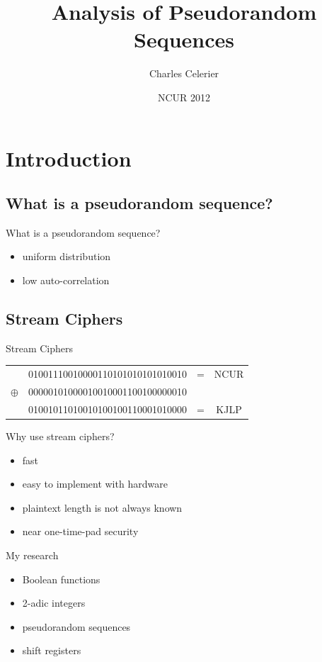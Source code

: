 \documentclass{beamer}
\begin{document}
\title{Analysis of Pseudorandom Sequences}
\author{Charles Celerier}
\date{NCUR 2012}
\frame{\titlepage}

\section{Introduction}
\subsection{What is a pseudorandom sequence?}
\begin{frame}{What is a pseudorandom sequence?}
  \begin{itemize}
      \pause
    \item uniform distribution
      \pause
    \item low auto-correlation
  \end{itemize}
\end{frame}

\subsection{Stream Ciphers}
\begin{frame}{Stream Ciphers}
  \begin{tabular}{c c c c}
    \pause
              & 01001110010000110101010101010010 & = & NCUR\\
              \pause
     $\oplus$ & 00000101000010010001100100000010 & \\
              \hline 
              \pause
              & 01001011010010100100110001010000 & = & KJLP
  \end{tabular}
\end{frame}

\begin{frame}{Why use stream ciphers?}
  \begin{itemize}
    \item fast
    \item easy to implement with hardware
    \item plaintext length is not always known
    \item near one-time-pad security
  \end{itemize}
\end{frame}

\begin{frame}{My research}
  \begin{itemize}
    \item Boolean functions
    \item 2-adic integers
    \item pseudorandom sequences
    \item shift registers
  \end{itemize}
\end{frame}
\end{document}
